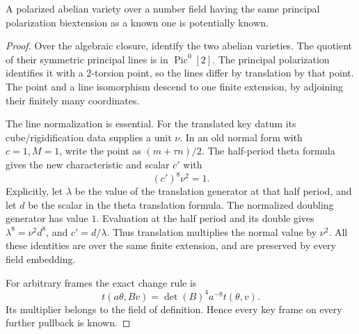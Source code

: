 \begin{srlemma}
\label{lem:ftb-known-same-polarization}
A polarized abelian variety over a number field having the
same principal polarization biextension as a known one is
potentially known.
\end{srlemma}
\begin{proof}
Over the algebraic closure, identify the two abelian varieties.
The quotient of their symmetric principal lines is in
\(\operatorname{Pic}^0[2]\).
The principal polarization identifies it with a \(2\)-torsion
point, so the lines differ by translation by that point.
The point and a line isomorphism descend to one finite
extension, by adjoining their finitely many coordinates.

The line normalization is essential.
For the translated key datum its cube/rigidification data
supplies a unit \(\nu\).
In an old normal form with \(c=1,M=1\), write the point as
\((m+\tau n)/2\).
The half-period theta formula gives the new characteristic
and scalar \(c'\) with
\[
                               (c')^8\nu^2=1.
\]
Explicitly, let \(\lambda\) be the value of the translation
generator at that half period, and let \(d\) be the scalar
in the theta translation formula.
The normalized doubling generator has value \(1\).
Evaluation at the half period and its double gives
\(\lambda^8=\nu^2d^8\), and \(c'=d/\lambda\).
Thus translation multiplies the normal value by \(\nu^2\).
All these identities are over the same finite extension,
and are preserved by every field embedding.

For arbitrary frames the exact change rule is
\[
                    t(a\theta,Bv)=\det(B)^4a^{-8}t(\theta,v).
 \tag{F7}\label{eq:ftb-known-frame-change}
\]
Its multiplier belongs to the field of definition.
Hence every key frame on every further pullback is known.
\end{proof}

